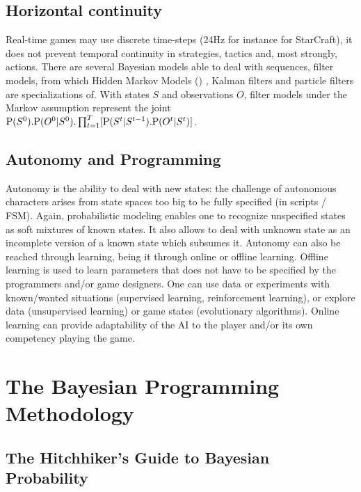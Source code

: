 \subsection{Horizontal continuity}
Real-time games may use discrete time-steps (24Hz for instance for StarCraft), it does not prevent temporal continuity in strategies, tactics and, most strongly, actions. There are several Bayesian models able to deal with sequences, filter models, from which Hidden Markov Models () \citep{Rabiner}, Kalman filters \citep{Kalman1960} and particle filters \citep{particleFiltering} are specializations of. With states $S$ and observations $O$, filter models under the Markov assumption represent the joint $\mathrm{P}(S^0).\mathrm{P}(O^0|S^0).\prod_{t=1}^T[\mathrm{P}(S^t | S^{t-1}).\mathrm{P}(O^t|S^t)]$.

\subsection{Autonomy and Programming}
Autonomy is the ability to deal with new states: the challenge of autonomous characters arises from state spaces too big to be fully specified (in scripts / FSM). Again, probabilistic modeling enables one to recognize unspecified states as soft mixtures of known states. It also allows to deal with unknown state as an incomplete version of a known state which subsumes it. Autonomy can also be reached through learning, being it through online or offline learning. Offline learning is used to learn parameters that does not have to be specified by the programmers and/or game designers. One can use data or experiments with known/wanted situations (supervised learning, reinforcement learning), or explore data (unsupervised learning) or game states (evolutionary algorithms). Online learning can provide adaptability of the AI to the player and/or its own competency playing the game.

\section{The Bayesian Programming Methodology}

\subsection{The Hitchhiker's Guide to Bayesian Probability}

